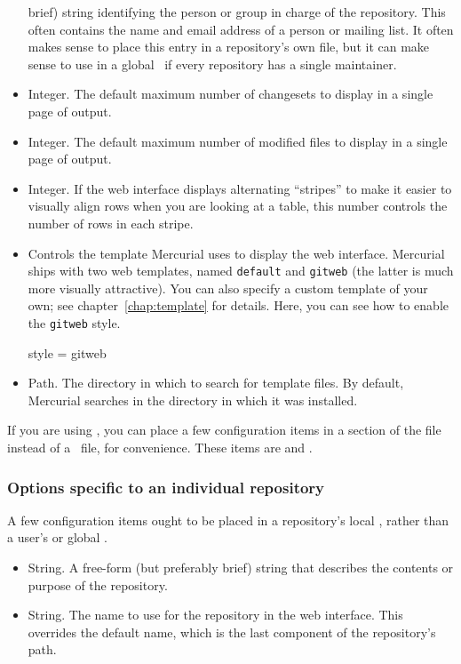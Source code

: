 \begin{itemize}
  brief) string identifying the person or group in charge of the
  repository.  This often contains the name and email address of a
  person or mailing list.  It often makes sense to place this entry in
  a repository's own  file, but it can make sense
  to use in a global \hgrc\ if every repository has a single
  maintainer.
\item[\rcitem{web}{maxchanges}] Integer.  The default maximum number
  of changesets to display in a single page of output.
\item[\rcitem{web}{maxfiles}] Integer.  The default maximum number
  of modified files to display in a single page of output.
\item[\rcitem{web}{stripes}] Integer.  If the web interface displays
  alternating ``stripes'' to make it easier to visually align rows
  when you are looking at a table, this number controls the number of
  rows in each stripe.
\item[\rcitem{web}{style}] Controls the template Mercurial uses to
  display the web interface.  Mercurial ships with two web templates,
  named \texttt{default} and \texttt{gitweb} (the latter is much more
  visually attractive).  You can also specify a custom template of
  your own; see chapter~\ref{chap:template} for details.  Here, you
  can see how to enable the \texttt{gitweb} style.
  \begin{codesample4}
    [web]
    style = gitweb
  \end{codesample4}
\item[\rcitem{web}{templates}] Path.  The directory in which to search
  for template files.  By default, Mercurial searches in the directory
  in which it was installed.
\end{itemize}
If you are using , you can place a few
configuration items in a  section of the
 file instead of a \hgrc\ file, for
convenience.  These items are  and
.

\subsubsection{Options specific to an individual repository}

A few  configuration items ought to be placed in a
repository's local , rather than a user's or
global \hgrc.
\begin{itemize}
\item[\rcitem{web}{description}] String.  A free-form (but preferably
  brief) string that describes the contents or purpose of the
  repository.
\item[\rcitem{web}{name}] String.  The name to use for the repository
  in the web interface.  This overrides the default name, which is the
  last component of the repository's path.
\end{itemize}

